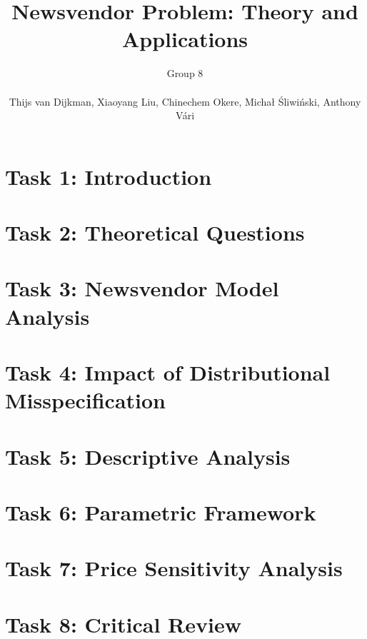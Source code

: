 \documentclass{article}
\title{\textbf{Newsvendor Problem: Theory and Applications}}
\author{Group 8 \\ \\Thijs van Dijkman, Xiaoyang Liu, Chinechem Okere, Michał Śliwiński, Anthony Vári}
\date{}
\begin{document}
\maketitle
\bigskip

\section*{Task 1: Introduction}


\section*{Task 2: Theoretical Questions}


\section*{Task 3: Newsvendor Model Analysis}


\section*{Task 4: Impact of Distributional Misspecification}


\section*{Task 5: Descriptive Analysis}


\section*{Task 6: Parametric Framework}


\section*{Task 7: Price Sensitivity Analysis}


\section*{Task 8: Critical Review}


\vspace*{4cm}


\end{document}
